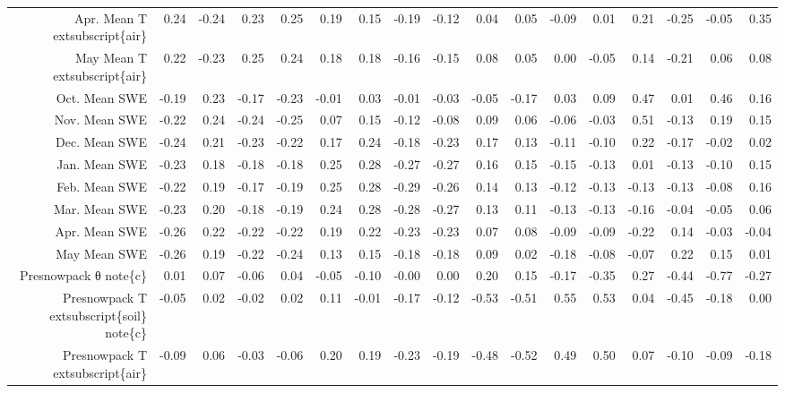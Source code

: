 \begin{table}[ht]
\begin{tabular}{rrrrrrrrrrrrrrrrr}
  Apr. Mean T	extsubscript\{air\} & 0.24 & -0.24 & 0.23 & 0.25 & 0.19 & 0.15 & -0.19 & -0.12 & 0.04 & 0.05 & -0.09 & 0.01 & 0.21 & -0.25 & -0.05 & 0.35 \\ 
  May Mean T	extsubscript\{air\} & 0.22 & -0.23 & 0.25 & 0.24 & 0.18 & 0.18 & -0.16 & -0.15 & 0.08 & 0.05 & 0.00 & -0.05 & 0.14 & -0.21 & 0.06 & 0.08 \\ 
  Oct. Mean SWE & -0.19 & 0.23 & -0.17 & -0.23 & -0.01 & 0.03 & -0.01 & -0.03 & -0.05 & -0.17 & 0.03 & 0.09 & 0.47 & 0.01 & 0.46 & 0.16 \\ 
  Nov. Mean SWE & -0.22 & 0.24 & -0.24 & -0.25 & 0.07 & 0.15 & -0.12 & -0.08 & 0.09 & 0.06 & -0.06 & -0.03 & 0.51 & -0.13 & 0.19 & 0.15 \\ 
  Dec. Mean SWE & -0.24 & 0.21 & -0.23 & -0.22 & 0.17 & 0.24 & -0.18 & -0.23 & 0.17 & 0.13 & -0.11 & -0.10 & 0.22 & -0.17 & -0.02 & 0.02 \\ 
  Jan. Mean SWE & -0.23 & 0.18 & -0.18 & -0.18 & 0.25 & 0.28 & -0.27 & -0.27 & 0.16 & 0.15 & -0.15 & -0.13 & 0.01 & -0.13 & -0.10 & 0.15 \\ 
  Feb. Mean SWE & -0.22 & 0.19 & -0.17 & -0.19 & 0.25 & 0.28 & -0.29 & -0.26 & 0.14 & 0.13 & -0.12 & -0.13 & -0.13 & -0.13 & -0.08 & 0.16 \\ 
  Mar. Mean SWE & -0.23 & 0.20 & -0.18 & -0.19 & 0.24 & 0.28 & -0.28 & -0.27 & 0.13 & 0.11 & -0.13 & -0.13 & -0.16 & -0.04 & -0.05 & 0.06 \\ 
  Apr. Mean SWE & -0.26 & 0.22 & -0.22 & -0.22 & 0.19 & 0.22 & -0.23 & -0.23 & 0.07 & 0.08 & -0.09 & -0.09 & -0.22 & 0.14 & -0.03 & -0.04 \\ 
  May Mean SWE & -0.26 & 0.19 & -0.22 & -0.24 & 0.13 & 0.15 & -0.18 & -0.18 & 0.09 & 0.02 & -0.18 & -0.08 & -0.07 & 0.22 & 0.15 & 0.01 \\ 
  Presnowpack θ	note\{c\} & 0.01 & 0.07 & -0.06 & 0.04 & -0.05 & -0.10 & -0.00 & 0.00 & 0.20 & 0.15 & -0.17 & -0.35 & 0.27 & -0.44 & -0.77 & -0.27 \\ 
  Presnowpack T	extsubscript\{soil\}	note\{c\} & -0.05 & 0.02 & -0.02 & 0.02 & 0.11 & -0.01 & -0.17 & -0.12 & -0.53 & -0.51 & 0.55 & 0.53 & 0.04 & -0.45 & -0.18 & 0.00 \\ 
  Presnowpack T	extsubscript\{air\} & -0.09 & 0.06 & -0.03 & -0.06 & 0.20 & 0.19 & -0.23 & -0.19 & -0.48 & -0.52 & 0.49 & 0.50 & 0.07 & -0.10 & -0.09 & -0.18 \\ 
   \hline
\end{tabular}
\end{table}
